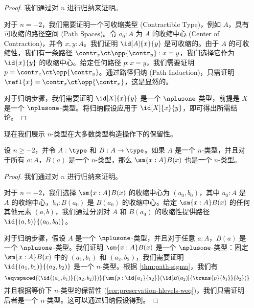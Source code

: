 \begin{proof}
    我们通过对 $n$ 进行归纳来证明。

    对于 $n = -2$，我们需要证明一个可收缩类型 (Contractible Type)，例如 $A$，具有可收缩的路径空间 (Path Spaces)。令 $a_0: A$ 为 $A$ 的收缩中心 (Center of Contraction)，并令 $x, y : A$。我们证明 $\id[A]{x}{y}$ 是可收缩的。由于 $A$ 的可收缩性，我们有一条路径 $\contr_x \ct \opp{\contr_y} : x = y$，我们选择它作为 $\id{x}{y}$ 的收缩中心。给定任何路径 $p : x = y$，我们需要证明 $p = \contr_x \ct \opp{\contr_y}$。通过路径归纳 (Path Induction)，只需证明 $\refl{x} = \contr_x \ct \opp{\contr_x}$，这是显然的。

    对于归纳步骤，我们需要证明 $\id[X]{x}{y}$ 是一个 $\nplusone$-类型，前提是 $X$ 是一个 $\nplusone$-类型。将归纳假设应用于 $\id[X]{x}{y}$，即可得出所需结论。
\end{proof}


现在我们展示 $n$-类型在大多数类型构造操作下的保留性。

\begin{thm}\label{thm:ntypes-sigma}
设 $n \geq -2$，并令 $A : \type$ 和 $B : A \to \type$。如果 $A$ 是一个 $n$-类型，并且对于所有 $a : A$，$B(a)$ 是一个 $n$-类型，那么 $\sm{x : A} B(x)$ 也是一个 $n$-类型。
\end{thm}

\begin{proof}
    我们通过对 $n$ 进行归纳来证明。

    对于 $n = -2$，我们选择 $\sm{x : A} B(x)$ 的收缩中心为 $(a_0, b_0)$，其中 $a_0 : A$ 是 $A$ 的收缩中心，$b_0 : B(a_0)$ 是 $B(a_0)$ 的收缩中心。给定 $\sm{x : A} B(x)$ 的任何其他元素 $(a,b)$，我们通过分别对 $A$ 和 $B(a_0)$ 的收缩性提供路径 $\id{(a, b)}{(a_0,b_0)}$。

    对于归纳步骤，假设 $A$ 是一个 $\nplusone$-类型，并且对于任意 $a : A$，$B(a)$ 是一个 $\nplusone$-类型。我们证明 $\sm{x : A} B(x)$ 是一个 $\nplusone$-类型：固定 $\sm{x : A} B(x)$ 中的 $(a_1, b_1)$ 和 $(a_2,b_2)$，我们需要证明 $\id{(a_1, b_1)}{(a_2,b_2)}$ 是一个 $n$-类型。根据 \cref{thm:path-sigma}，我们有
    \[ \eqvspaced{(\id{(a_1, b_1)}{(a_2,b_2)})}{\sm{p : \id{a_1}{a_2}} (\id[B(a_2)]{\trans{p}{b_1}}{b_2})} \]
    并且根据等价下 $n$-类型的保留性 (\cref{cor:preservation-hlevels-weq})，我们只需证明后者是一个 $n$-类型。这可以通过归纳假设得到。
\end{proof}

